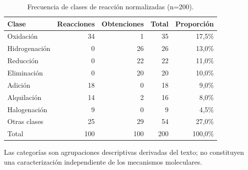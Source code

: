 \begin{table}[!t]
\centering
\begin{threeparttable}
\caption{Frecuencia de clases de reacción normalizadas (n=200).}
\label{tab:clases}
\footnotesize
\begin{tabular}{lrrrr}
\toprule
Clase & Reacciones & Obtenciones & Total & Proporción \\
\midrule
Oxidación & 34 & 1 & 35 & 17,5\% \\
Hidrogenación & 0 & 26 & 26 & 13,0\% \\
Reducción & 0 & 22 & 22 & 11,0\% \\
Eliminación & 0 & 20 & 20 & 10,0\% \\
Adición & 18 & 0 & 18 & 9,0\% \\
Alquilación & 14 & 2 & 16 & 8,0\% \\
Halogenación & 9 & 0 & 9 & 4,5\% \\
Otras clases & 25 & 29 & 54 & 27,0\% \\
\midrule
Total & 100 & 100 & 200 & 100,0\% \\
\bottomrule
\end{tabular}
\begin{tablenotes}
\footnotesize
\item Las categorías son agrupaciones descriptivas derivadas del texto; no constituyen una caracterización independiente de los mecanismos moleculares.
\end{tablenotes}
\end{threeparttable}
\end{table}

